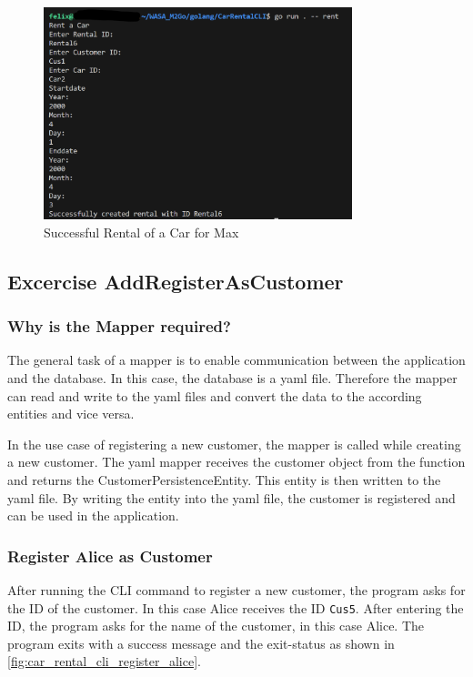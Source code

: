\begin{figure}
      \centering
      \includegraphics[width=0.8\textwidth]{figures/goLang/carRental/carRentalCLI/carRentalCli_SuccessfulRentalMax.png}
      \caption{Successful Rental of a Car for Max}
      \label{fig:car_rental_cli_successful_rental_max}
\end{figure}

\subsection{Excercise AddRegisterAsCustomer}
\label{sec:exercise_add_register_as_customer}
\subsubsection*{Why is the Mapper required?}
The general task of a mapper is to enable communication between the application and the database.
In this case, the database is a yaml file.
Therefore the mapper can read and write to the yaml files and convert the data to the according entities and vice versa.

In the use case of registering a new customer, the mapper is called while creating a new customer.
The yaml mapper receives the customer object from the function and returns the CustomerPersistenceEntity.
This entity is then written to the yaml file.
By writing the entity into the yaml file, the customer is registered and can be used in the application.

\subsubsection*{Register Alice as Customer}
After running the CLI command to register a new customer, the program asks for the ID of the customer.
In this case Alice receives the ID \texttt{Cus5}.
After entering the ID, the program asks for the name of the customer, in this case Alice.
The program exits with a success message and the exit-status as shown in \autoref{fig:car_rental_cli_register_alice}.

